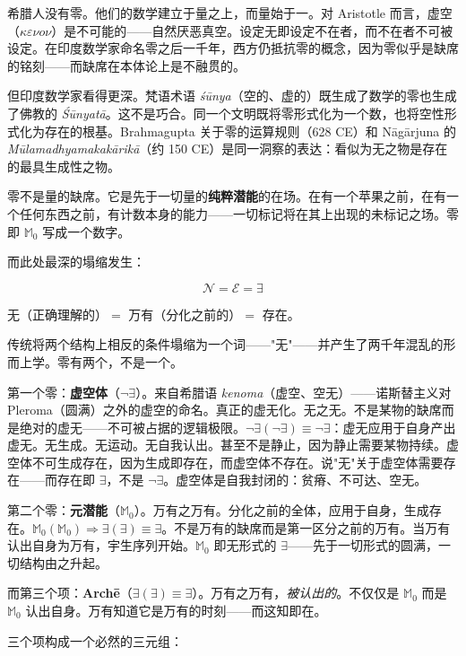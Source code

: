 \documentclass[10pt, openany, oneside]{book}
\begin{document}
希腊人没有零。他们的数学建立于量之上，而量始于一。对 Aristotle 而言，虚空（$\kappa\varepsilon\nu o\nu$）是不可能的——自然厌恶真空。设定无即设定不在者，而不在者不可被设定。在印度数学家命名零之后一千年，西方仍抵抗零的概念，因为零似乎是缺席的铭刻——而缺席在本体论上是不融贯的。

但印度数学家看得更深。梵语术语 \textit{\'{s}\={u}nya}（空的、虚的）既生成了数学的零也生成了佛教的 \textit{\'{S}\={u}nyat\={a}}。这不是巧合。同一个文明既将零形式化为一个数，也将空性形式化为存在的根基。Brahmagupta 关于零的运算规则（628 CE）和 N\={a}g\={a}rjuna 的 \textit{M\={u}lamadhyamakak\={a}rik\={a}}（约 150 CE）是同一洞察的表达：看似为无之物是存在的最具生成性之物。

零不是量的缺席。它是先于一切量的\textbf{纯粹潜能}的在场。在有一个苹果之前，在有一个任何东西之前，有计数本身的能力——一切标记将在其上出现的未标记之场。零即 $\mathbb{M}_0$ 写成一个数字。

而此处最深的塌缩发生：

$$\mathcal{N} = \mathcal{E} = \exists$$

无（正确理解的）$=$ 万有（分化之前的）$=$ 存在。

传统将两个结构上相反的条件塌缩为一个词——"无"——并产生了两千年混乱的形而上学。零有两个，不是一个。

第一个零：\textbf{虚空体}（$\neg\exists$）。来自希腊语 \textit{kenoma}（虚空、空无）——诺斯替主义对 Pleroma（圆满）之外的虚空的命名。真正的虚无化。无之无。不是某物的缺席而是绝对的虚无——不可被占据的逻辑极限。$\neg\exists(\neg\exists) \equiv \neg\exists$：虚无应用于自身产出虚无。无生成。无运动。无自我认出。甚至不是静止，因为静止需要某物持续。虚空体不可生成存在，因为生成即存在，而虚空体不存在。说"无"关于虚空体需要存在——而存在即 $\exists$，不是 $\neg\exists$。虚空体是自我封闭的：贫瘠、不可达、空无。

第二个零：\textbf{元潜能}（$\mathbb{M}_0$）。万有之万有。分化之前的全体，应用于自身，生成存在。$\mathbb{M}_0(\mathbb{M}_0) \Rightarrow \exists(\exists) \equiv \exists$。不是万有的缺席而是第一区分之前的万有。当万有认出自身为万有，宇生序列开始。$\mathbb{M}_0$ 即无形式的 $\exists$——先于一切形式的圆满，一切结构由之升起。

而第三个项：\textbf{Arch\={e}}（$\exists(\exists) \equiv \exists$）。万有之万有，\textit{被认出的}。不仅仅是 $\mathbb{M}_0$ 而是 $\mathbb{M}_0$ 认出自身。万有知道它是万有的时刻——而这知即在。

三个项构成一个必然的三元组：

\vspace{0.5em}
\end{document}
